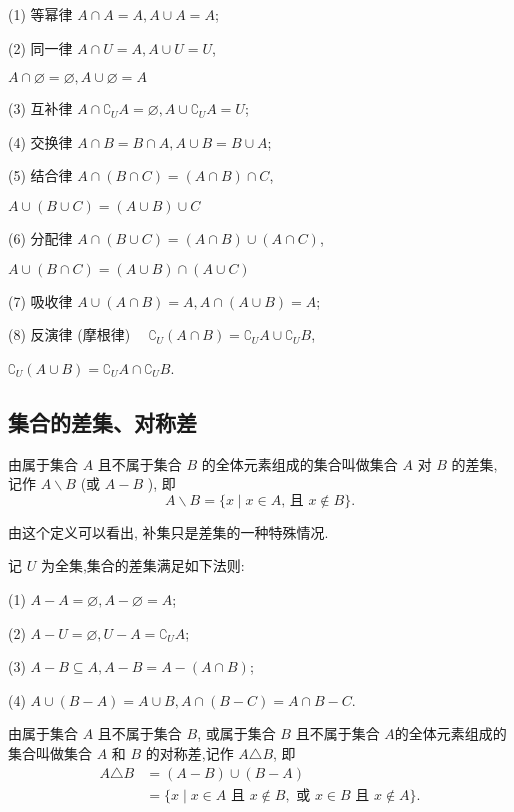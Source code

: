 (1) 等幂律 $A \cap A=A, A \cup A=A$;

(2) 同一律 $A \cap U=A, A \cup U=U$,

$A \cap \varnothing=\varnothing, A \cup \varnothing=A$

(3) 互补律 $A \cap \complement_{U} A=\varnothing, A \cup \complement_{U} A=U$;

(4) 交换律 $A \cap B=B \cap A, A \cup B=B \cup A$;

(5) 结合律 $A \cap(B \cap C)=(A \cap B) \cap C$,

$A \cup(B \cup C)=(A \cup B) \cup C$

(6) 分配律 $A \cap(B \cup C)=(A \cap B) \cup(A \cap C)$,

$A \cup(B \cap C)=(A \cup B) \cap(A \cup C)$

(7) 吸收律 $A \cup(A \cap B)=A, A \cap(A \cup B)=A$;

(8) 反演律 (摩根律) $\quad \complement_{U}(A \cap B)=\complement_{U} A \cup \complement_{U} B$,

$\complement_{U}(A \cup B)=\complement_{U} A \cap \complement_{U} B$.

\subsection{集合的差集、对称差}
\begin{definition}
	由属于集合 $A$ 且不属于集合 $B$ 的全体元素组成的集合叫做集合 $A$ 对 $B$ 的差集, 记作 $A \backslash B$ (或 $A-B$ ), 即
	$$
		A \backslash B=\{x \mid x \in A \text {, 且 } x \notin B\} .
	$$
\end{definition}
由这个定义可以看出, 补集只是差集的一种特殊情况.

记 $U$ 为全集,集合的差集满足如下法则:

(1) $A-A=\varnothing, A-\varnothing=A$;

(2) $A-U=\varnothing, U-A=\complement_{U} A$;

(3) $A-B \subseteq A, A-B=A-(A \cap B)$;

(4) $A \cup(B-A)=A \cup B, A \cap(B-C)=A \cap B-C$.

\begin{definition}
	由属于集合 $A$ 且不属于集合 $B$, 或属于集合 $B$ 且不属于集合 $A$的全体元素组成的集合叫做集合 $A$ 和 $B$ 的对称差,记作 $A \triangle B$, 即
	$$
		\begin{aligned}
			A \triangle B & =(A-B) \cup(B-A)                                                                         \\
			              & =\{x \mid x \in A \text { 且 } x \notin B, \text { 或 } x \in B \text { 且 } x \notin A\} .
		\end{aligned}
	$$
\end{definition}

